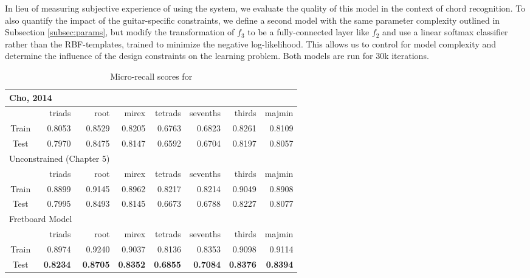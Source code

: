 In lieu of measuring subjective experience of using the system, we evaluate the quality of this model in the context of chord recognition.
To also quantify the impact of the guitar-specific constraints, we define a second model with the same parameter complexity outlined in Subsection \ref{subsec:params}, but modify the transformation of $f_3$ to be a fully-connected layer like $f_2$ and use a linear softmax classifier rather than the RBF-templates, trained to minimize the negative log-likelihood.
This allows us to control for model complexity and determine the influence of the design constraints on the learning problem.
Both models are run for 30k iterations.


\begin{table}[t]
\begin{center}
\scriptsize
\caption{Micro-recall scores for }
\label{tab:rc_agreement}
\begin{tabular}{c|rrrrrrr}

\hline
\multicolumn{3}{l}{Cho, 2014} & & & & & \\
\hline
 & triads &   root &   mirex &   tetrads &   sevenths &   thirds &   majmin \\
\hline
Train & 0.8053 & 0.8529 &  0.8205 & 0.6763 & 0.6823 & 0.8261 & 0.8109 \\
Test & 0.7970 & 0.8475 & 0.8147 & 0.6592 & 0.6704 & 0.8197 & 0.8057 \\
\hline
\hline
\multicolumn{3}{l}{Unconstrained (Chapter 5)} & & & & & \\
\hline
 & triads &   root &   mirex &   tetrads &   sevenths &   thirds &   majmin \\
\hline
Train & 0.8899 & 0.9145 & 0.8962 & 0.8217 & 0.8214 & 0.9049 & 0.8908 \\
Test  & 0.7995 & 0.8493 & 0.8145 & 0.6673 & 0.6788 & 0.8227 & 0.8077 \\
\hline
\hline
\multicolumn{3}{l}{Fretboard Model} & & & & & \\
\hline
 & triads &   root &   mirex &   tetrads &   sevenths &   thirds &   majmin \\
\hline
Train & 0.8974 & 0.9240 & 0.9037 & 0.8136 & 0.8353 & 0.9098 & 0.9114 \\
Test & \textbf{0.8234} & \textbf{0.8705} & \textbf{0.8352} & \textbf{0.6855} & \textbf{0.7084} & \textbf{0.8376} & \textbf{0.8394} \\
\hline
\end{tabular}
\end{center}
\end{table}
